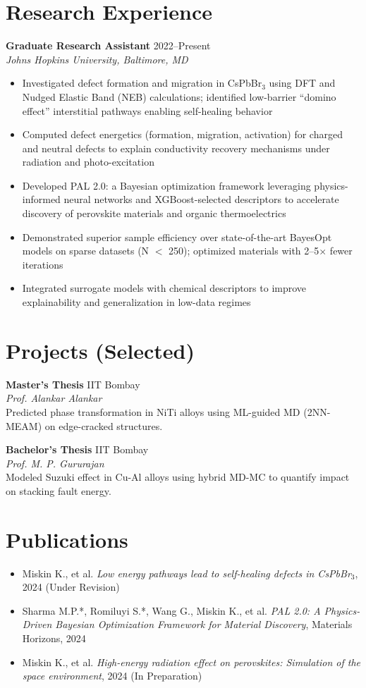 \documentclass[10pt]{article}
\begin{document}
\section*{Research Experience}
\textbf{Graduate Research Assistant} \hfill 2022--Present \\
\textit{Johns Hopkins University, Baltimore, MD}
\begin{itemize}[leftmargin=*]
    \item Investigated defect formation and migration in CsPbBr$_3$ using DFT and Nudged Elastic Band (NEB) calculations; identified low-barrier “domino effect” interstitial pathways enabling self-healing behavior
    \item Computed defect energetics (formation, migration, activation) for charged and neutral defects to explain conductivity recovery mechanisms under radiation and photo-excitation
    \item Developed PAL 2.0: a Bayesian optimization framework leveraging physics-informed neural networks and XGBoost-selected descriptors to accelerate discovery of perovskite materials and organic thermoelectrics
    \item Demonstrated superior sample efficiency over state-of-the-art BayesOpt models on sparse datasets (N $<$ 250); optimized materials with 2--5$\times$ fewer iterations
    \item Integrated surrogate models with chemical descriptors to improve explainability and generalization in low-data regimes
\end{itemize}

\section*{Projects \normalfont\normalsize (Selected)}
\textbf{Master’s Thesis} \hfill IIT Bombay \\
\textit{Prof. Alankar Alankar} \\
Predicted phase transformation in NiTi alloys using ML-guided MD (2NN-MEAM) on edge-cracked structures.

\textbf{Bachelor’s Thesis} \hfill IIT Bombay \\
\textit{Prof. M. P. Gururajan} \\
Modeled Suzuki effect in Cu-Al alloys using hybrid MD-MC to quantify impact on stacking fault energy.

\section*{Publications}
\begin{itemize}[leftmargin=*]
    \item Miskin K., et al. \textit{Low energy pathways lead to self-healing defects in CsPbBr$_3$}, 2024 (Under Revision)
    \item Sharma M.P.*, Romiluyi S.*, Wang G., Miskin K., et al. \textit{PAL 2.0: A Physics-Driven Bayesian Optimization Framework for Material Discovery}, Materials Horizons, 2024
    \item Miskin K., et al. \textit{High-energy radiation effect on perovskites: Simulation of the space environment}, 2024 (In Preparation)
\end{itemize}
\end{document}

